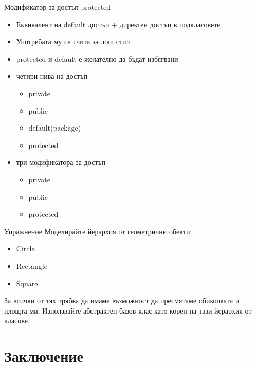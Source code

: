 \documentclass{beamer}
\begin{document}
\begin{frame}{Модификатор за достъп protected}
  \transdissolve
  \begin{itemize}
  \item Еквивалент на default достъп + директен достъп в подкласовете \pause
  \item Употребата му се счита за лош стил \pause
  \item protected и default е желателно да бъдат избягвани \pause
  \item четири нива на достъп
    \begin{itemize}
      \item private
      \item public
      \item default(package)
      \item protected
    \end{itemize}
  \item три модификатора за достъп \pause
    \begin{itemize}
      \item private
      \item public
      \item protected
    \end{itemize}
  \end{itemize}
\end{frame}

\begin{frame}{Упражнение}
  \transdissolve
  Моделирайте йерархия от геометрични обекти:
  \begin{itemize}
    \item Circle
    \item Rectangle
    \item Square
  \end{itemize}
  За всички от тях трябва да имаме възможност да пресмятаме обиколката и
  площта ми. Използвайте абстрактен базов клас като корен на тази
  йерархия от класове.
\end{frame}

\section*{Заключение}
\end{document}

